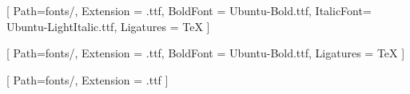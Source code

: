 \usepackage{qrcode}

\newcommand{\boxnum}[1]{%
  \fbox{\rule{0pt}{1.2em}\rule{1.2em}{0pt}#1}%
}

\usepackage{fontspec}

\setmainfont{Ubuntu-light.ttf}[
  Path=fonts/,
  Extension = .ttf,
  BoldFont  = Ubuntu-Bold.ttf,
  ItalicFont= Ubuntu-LightItalic.ttf,
  Ligatures = TeX
]

\setsansfont{Ubuntu-Light.ttf}[
  Path=fonts/,
  Extension = .ttf,
  BoldFont  = Ubuntu-Bold.ttf,  %
  Ligatures = TeX
]

\setmonofont{Ubuntu-Light.ttf}[
  Path=fonts/,
  Extension = .ttf
]